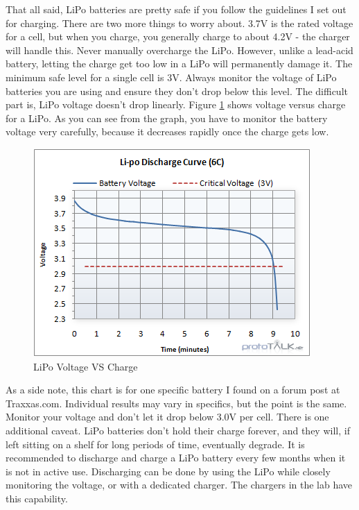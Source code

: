 That all said, LiPo batteries are pretty safe if you follow the guidelines I set out for charging. There are two more things to worry about. 3.7V is the rated voltage for a cell, but when you charge, you generally charge to about 4.2V - the charger will handle this. Never manually overcharge the LiPo. However, unlike a lead-acid battery, letting the charge get too low in a LiPo will permanently damage it. The minimum safe level for a single cell is 3V. Always monitor the voltage of LiPo batteries you are using and ensure they don't drop below this level. The difficult part is, LiPo voltage doesn't drop linearly. Figure \ref{fig:lipovoltage} shows voltage versus charge for a LiPo. As you can see from the graph, you have to monitor the battery voltage very carefully, because it decreases rapidly once the charge gets low.

\begin{figure}[h]
\centering
\includegraphics[scale=0.75]{lipovoltage.png}
\caption{LiPo Voltage VS Charge}
\label{fig:lipovoltage}
\end{figure}

As a side note, this chart is for one specific battery I found on a forum post at Traxxas.com. Individual results may vary in specifics, but the point is the same. Monitor your voltage and don't let it drop below 3.0V per cell. There is one additional caveat. LiPo batteries don't hold their charge forever, and they will, if left sitting on a shelf for long periods of time, eventually degrade. It is recommended to discharge and charge a LiPo battery every few months when it is not in active use. Discharging can be done by using the LiPo while closely monitoring the voltage, or with a dedicated charger. The chargers in the lab have this capability.

